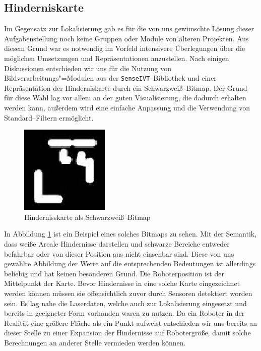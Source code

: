 \subsection{Hinderniskarte}
\label{hinderniskarte_subsec}
\authorsection{\editorandreas}
 Im Gegensatz zur Lokalisierung gab es für die von uns gewünschte Lösung dieser
 Aufgabenstellung noch keine Gruppen oder Module von älteren Projekten. Aus
 diesem Grund war es notwendig im Vorfeld intensivere Überlegungen über die möglichen
 Umsetzungen und Repräsentationen anzustellen.
 Nach einigen Diskussionen entschieden wir uns für die Nutzung von
 Bildverarbeitungs"=Modulen aus der \lstinline{SenseIVT}--Bibliothek
 und einer Repräsentation der Hinderniskarte durch ein
 Schwarzweiß--Bitmap. Der Grund für diese Wahl lag vor
 allem an der guten Visualisierung, die dadurch erhalten werden kann, außerdem wird eine einfache
 Anpassung und die Verwendung von Standard--Filtern ermöglicht.
\begin{figure}[h]
\center
\includegraphics[scale=0.7]{graphics/hinderniskarte.jpg}
\caption{\label{fig:hinderniskarte} Hindernisskarte als Schwarzweiß--Bitmap}
\end{figure}
 In Abbildung \ref{fig:hinderniskarte} ist ein Beispiel eines solches Bitmaps
 zu sehen. Mit der Semantik, dass weiße Areale Hindernisse darstellen und schwarze Bereiche entweder befahrbar
 oder von dieser Position aus nicht einsehbar sind. Diese von uns gewählte Abbildung der Werte
 auf die entsprechenden Bedeutungen ist allerdings beliebig und hat keinen besonderen Grund.
 Die Roboterposition ist der Mittelpunkt der Karte. Bevor Hindernisse in eine solche Karte eingezeichnet werden
 können müssen sie offensichtlich zuvor durch Sensoren detektiert worden sein. Es lag nahe die Laserdaten,
 welche auch zur Lokalisierung eingesetzt und bereits in geeigneter Form vorhanden waren zu nutzen.
 Da ein Roboter in der Realität eine größere Fläche als ein Punkt aufweist entschieden wir uns bereits an dieser
 Stelle zu einer Expansion der Hindernisse auf Robotergröße, damit solche Berechnungen an anderer Stelle vermieden
 werden können.
